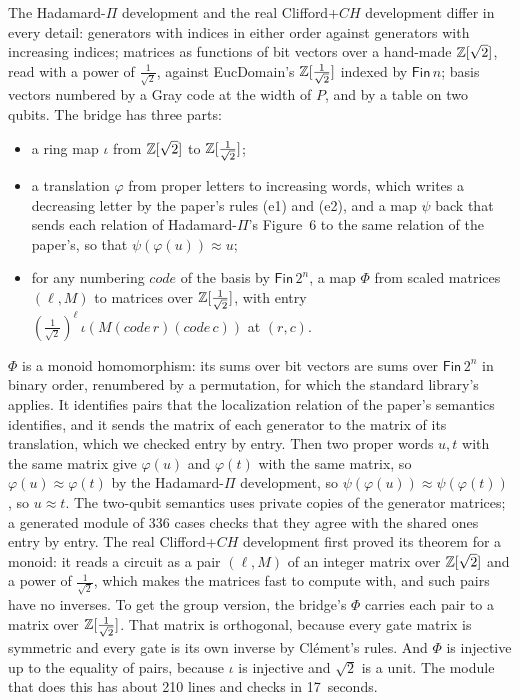 The Hadamard-$\Pi$ development and the real Clifford+$CH$ development
differ in every detail: generators with indices in either order against
generators with increasing indices; matrices as functions of bit
vectors over a hand-made $\mathbb{Z}[\sqrt2]$, read with a power of
$\frac1{\sqrt2}$, against EucDomain's $\mathbb{Z}[\frac1{\sqrt2}]$ indexed by
$\mathsf{Fin}\,n$; basis vectors numbered by a Gray code at the width
of $P$, and by a table on two qubits. The bridge has three parts:
\begin{itemize}
\item a ring map $\iota$ from $\mathbb{Z}[\sqrt2]$ to $\mathbb{Z}[\frac1{\sqrt2}]$;
\item a translation $\varphi$ from proper letters to increasing words,
  which writes a decreasing letter by the paper's rules (e1) and (e2),
  and a map $\psi$ back that sends each relation of Hadamard-$\Pi$'s
  Figure~6 to the same relation of the paper's, so that
  $\psi(\varphi(u)) \approx u$;
\item for any numbering $\mathit{code}$ of the basis by
  $\mathsf{Fin}\,2^n$, a map $\Phi$ from scaled matrices
  $(\ell, M)$ to matrices over $\mathbb{Z}[\frac1{\sqrt2}]$, with entry
  $(\frac1{\sqrt2})^\ell\,\iota(M(\mathit{code}\,r)(\mathit{code}\,c))$ at
  $(r,c)$.
\end{itemize}
$\Phi$ is a monoid homomorphism: its sums over bit vectors are sums over
$\mathsf{Fin}\,2^n$ in binary order, renumbered by a permutation, for
which the standard library's  applies. It identifies
pairs that the localization relation of the paper's semantics
identifies, and it sends the matrix of each generator to the matrix of
its translation, which we checked entry by entry. Then two proper words
$u,t$ with the same matrix give $\varphi(u)$ and $\varphi(t)$ with the
same matrix, so $\varphi(u)\approx\varphi(t)$ by the Hadamard-$\Pi$
development, so $\psi(\varphi(u))\approx\psi(\varphi(t))$, so
$u\approx t$. The two-qubit semantics uses private copies of the
generator matrices; a generated module of 336 cases checks that they
agree with the shared ones entry by entry. The real Clifford+$CH$
development first proved its theorem for a monoid: it reads a circuit
as a pair $(\ell, M)$ of an integer matrix over $\mathbb{Z}[\sqrt2]$ and a
power of $\frac1{\sqrt2}$, which makes the matrices fast to compute
with, and such pairs have no inverses. To get the group version, the
bridge's $\Phi$ carries each pair to a matrix over
$\mathbb{Z}[\frac1{\sqrt2}]$. That matrix is orthogonal, because every gate
matrix is symmetric and every gate is its own inverse by Cl\'ement's
rules. And $\Phi$ is injective up to the equality of pairs, because
$\iota$ is injective and $\sqrt2$ is a unit. The module that does this
has about 210 lines and checks in 17~seconds.

